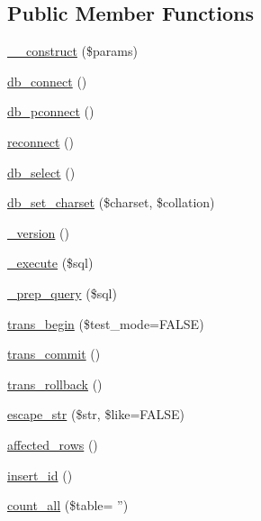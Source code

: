 \subsection*{Public Member Functions}
\begin{DoxyCompactItemize}
\item 
\hyperlink{class_c_i___d_b__odbc__driver_a9162320adff1a1a4afd7f2372f753a3e}{\-\_\-\-\_\-construct} (\$params)
\item 
\hyperlink{class_c_i___d_b__odbc__driver_a6aa545dcb7768f0b62d37cdcf7f09adc}{db\-\_\-connect} ()
\item 
\hyperlink{class_c_i___d_b__odbc__driver_a0f69e662bd02de5bcf98647068e7c653}{db\-\_\-pconnect} ()
\item 
\hyperlink{class_c_i___d_b__odbc__driver_a57c19c642ab3023e28d10c50f86ff0a8}{reconnect} ()
\item 
\hyperlink{class_c_i___d_b__odbc__driver_af0c7f2602586ea2050b19fb36baefb24}{db\-\_\-select} ()
\item 
\hyperlink{class_c_i___d_b__odbc__driver_adc8cd12121dc8edda3adcadd88a97e24}{db\-\_\-set\-\_\-charset} (\$charset, \$collation)
\item 
\hyperlink{class_c_i___d_b__odbc__driver_ac997a462bb342f97f414910f0e033fb6}{\-\_\-version} ()
\item 
\hyperlink{class_c_i___d_b__odbc__driver_a114ab675d89bf8324a41785fb475e86d}{\-\_\-execute} (\$sql)
\item 
\hyperlink{class_c_i___d_b__odbc__driver_a86af88ef0fa6d44ab4691e3f53270339}{\-\_\-prep\-\_\-query} (\$sql)
\item 
\hyperlink{class_c_i___d_b__odbc__driver_a90e153cf190d273336d77cce930587e1}{trans\-\_\-begin} (\$test\-\_\-mode=F\-A\-L\-S\-E)
\item 
\hyperlink{class_c_i___d_b__odbc__driver_af4fbdcdace4aa94a139b64877601fe9b}{trans\-\_\-commit} ()
\item 
\hyperlink{class_c_i___d_b__odbc__driver_a53f76d4dfcd6ac04fb653982442aeef8}{trans\-\_\-rollback} ()
\item 
\hyperlink{class_c_i___d_b__odbc__driver_aaba16891c8c93600a87075800cc5b72b}{escape\-\_\-str} (\$str, \$like=F\-A\-L\-S\-E)
\item 
\hyperlink{class_c_i___d_b__odbc__driver_a77248aaad33eb132c04cc4aa3f4bc8cb}{affected\-\_\-rows} ()
\item 
\hyperlink{class_c_i___d_b__odbc__driver_a933f2cde8dc7f87875e257d0a4902e99}{insert\-\_\-id} ()
\item 
\hyperlink{class_c_i___d_b__odbc__driver_a66111c61856499b091af32502978d4fc}{count\-\_\-all} (\$table= '')

\end{DoxyCompactItemize}
